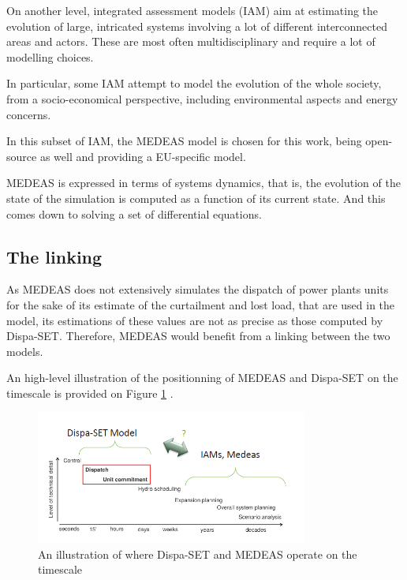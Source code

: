On another level, integrated assessment models (IAM) aim at estimating the evolution of large, intricated systems involving a lot of different interconnected areas and actors. These are most often multidisciplinary and require a lot of modelling choices.

In particular, some IAM attempt to model the evolution of the whole society, from a socio-economical perspective, including environmental aspects and energy concerns.

In this subset of IAM, the MEDEAS model is chosen for this work, being open-source as well and providing a EU-specific model.

MEDEAS is expressed in terms of systems dynamics, that is, the evolution of the state of the simulation is computed as a function of its current state. And this comes down to solving a set of differential equations.

\subsection{The linking}

As MEDEAS does not extensively simulates the dispatch of power plants units for the sake of its estimate of the curtailment and lost load, that are used in the model, its estimations of these values are not as precise as those computed by Dispa-SET. Therefore, MEDEAS would benefit from a linking between the two models.

An high-level illustration of the positionning of MEDEAS and Dispa-SET on the timescale is provided on Figure \ref{fig:dispaset-medeas-timescale} \cite{dispaset}.

\begin{figure}[h]
    \centering
    \includegraphics[width=0.8\textwidth]{resources/images/dispaset-medeas-timescale.png}
    \caption{An illustration of where Dispa-SET and MEDEAS operate on the timescale}
    \label{fig:dispaset-medeas-timescale}
\end{figure}

